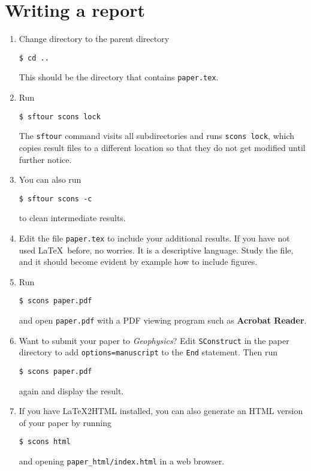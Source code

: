 \lstset{language=python,numbers=left,numberstyle=\tiny,showstringspaces=false}




\lstset{language=python,numbers=left,numberstyle=\tiny,showstringspaces=false}


\section{Writing a report}

\begin{enumerate}
\item Change directory to the parent directory
\begin{verbatim}
$ cd ..
\end{verbatim}
This should be the directory that contains \texttt{paper.tex}.
\item Run
\begin{verbatim}
$ sftour scons lock
\end{verbatim}
The \texttt{sftour} command visits all subdirectories and runs \texttt{scons lock}, which copies result files to a different location so that they do not get modified until further notice.
\item You can also run
\begin{verbatim}
$ sftour scons -c
\end{verbatim}
to clean intermediate results.
\item Edit the file \texttt{paper.tex} to include your additional results. If you have not used \LaTeX\ before, no worries. It is a descriptive language. Study the file, and it should become evident by example how to include figures.
\item Run
\begin{verbatim}
$ scons paper.pdf
\end{verbatim}
and open \texttt{paper.pdf} with a PDF viewing program such as \textbf{Acrobat Reader}. 
\item Want to submit your paper to \emph{Geophysics}? Edit \texttt{SConstruct} in the 
paper directory to add \texttt{options=manuscript} to the \texttt{End} statement. Then run
\begin{verbatim}
$ scons paper.pdf
\end{verbatim}
again and display the result.
\item If you have \LaTeX2HTML installed, you can also generate an HTML version of your paper by running
\begin{verbatim}
$ scons html
\end{verbatim}
and opening \verb#paper_html/index.html# in a web browser.
\end{enumerate}

%






